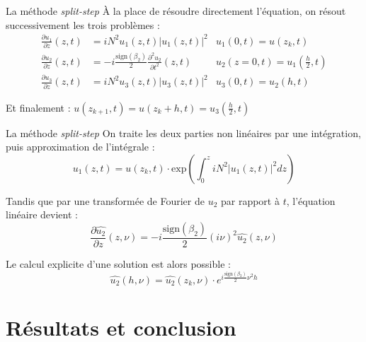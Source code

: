 \documentclass{beamer}
\begin{document}
\begin{frame}{La méthode \emph{split-step}}
  À la place de résoudre directement l'équation, on résout successivement les trois problèmes :
\begin{align*}
  \frac{\partial u_1}{\partial z}(z, t) &=   iN^2u_1(z, t)|u_1(z, t)|^2 
  & 
  u_1(0, t) = u(z_k, t) \\
  \frac{\partial u_2}{\partial z}(z, t) &= - i\frac{\text{sign}(\beta_2)}{2} \frac{\partial^2 u_2}{{\partial t}^2}(z, t)
  &
  u_2(z=0, t) = u_1(\frac{h}{2}, t) \\ 
  \frac{\partial u_3}{\partial z}(z, t) &=   iN^2u_3(z, t)|u_3(z, t)|^2
  &
  u_3(0, t) = u_2(h, t) 
\end{align*}

Et finalement : 
$u(z_{k+1}, t) = u(z_k + h, t) = u_3(\frac{h}{2}, t)$

\end{frame}


\begin{frame}{La méthode \emph{split-step}}
    On traite les deux parties non linéaires par une intégration, puis approximation de l'intégrale : 
    \begin{equation*}
      u_1(z, t) =  u(z_k, t)\cdot \text{exp}\left(\int_{0}^ziN^2|u_1(z, t)|^2dz\right)
    \end{equation*}

    Tandis que par une transformée de Fourier de $u_2$ par rapport à $t$, l'équation linéaire devient :
\begin{equation*}
  \frac{\partial \hat{u_2}}{\partial z}(z, \nu) = - i\frac{\text{sign}(\beta_2)}{2} (i\nu)^2\hat{u_2}(z, \nu) 
\end{equation*}

Le calcul explicite d'une solution est alors possible :
\begin{equation*}
  \hat{u_2}(h, \nu) 
= \hat{u_2}(z_k, \nu) \cdot e^{i\frac{\text{sign}(\beta_2)}{2} \nu^2 h} \label{eq_lin_solve}
\end{equation*}
\end{frame}
\section{Résultats et conclusion}
\end{document}
